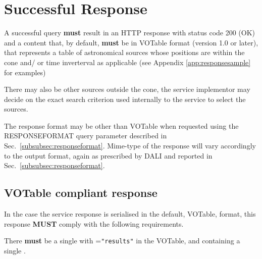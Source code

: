 \documentclass[11pt,a4paper]{ivoa} 
\begin{document}
\section{Successful Response} \label{sec:response} A successful query
\textbf{must} result in an HTTP response with status code 200 (OK) and a
content that, by default, \textbf{must} be in VOTable format (version
1.0 or later), that represents a table of astronomical sources whose
positions are within the cone and/ or time inverterval as applicable
(see Appendix \ref{app:responsesample} for examples)

There may also be other sources outside the cone, the service
implementor may decide on the exact search criterion used internally to
the service to select the sources.

The response format may be other than VOTable when requested using the
RESPONSEFORMAT query parameter described in
Sec.~\ref{subsubsec:responseformat}. Mime-type of the response will vary
accordingly to the output format, again as prescribed by DALI and
reported in Sec.~\ref{subsubsec:responseformat}.

\subsection{VOTable compliant response}

In the case the service response is serialised in the default, VOTable,
format, this response \textbf{MUST} comply with the following
requirements.

There \textbf{must} be a single  with
=\texttt{"results"} in
the VOTable, and containing a single .
\end{document}
